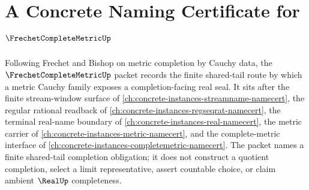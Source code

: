 \chapter{A Concrete Naming Certificate for $\FrechetCompleteMetricUp$}
\label{ch:concrete-instances-frechet-complete-metric-namecert}

Following Frechet and Bishop on metric completion by Cauchy data, the $\FrechetCompleteMetricUp$ packet records the finite shared-tail route by which a metric Cauchy family exposes a completion-facing real seal. It sits after the finite stream-window surface of \autoref{ch:concrete-instances-streamname-namecert}, the regular rational readback of \autoref{ch:concrete-instances-regseqrat-namecert}, the terminal real-name boundary of \autoref{ch:concrete-instances-real-namecert}, the metric carrier of \autoref{ch:concrete-instances-metric-namecert}, and the complete-metric interface of \autoref{ch:concrete-instances-completemetric-namecert}. The packet names a finite shared-tail completion obligation; it does not construct a quotient completion, select a limit representative, assert countable choice, or claim ambient $\RealUp$ completeness.

